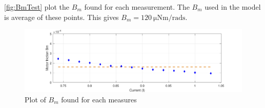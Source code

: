 \autoref{fig:BmTest} plot the $B_m$ found for each measurement. The $B_m$ used in the model is average of these points. This gives $B_m=\SI{120}{\micro\newton\meter\per\radian\second}$.

\begin{figure}[htbp]
	\centering
	\includegraphics[width=\textwidth]{figures/appendix/Motor&GearTests/PlotBm}
	\caption{Plot of $B_m$ found for each measures}\label{fig:BmTest}
\end{figure}

